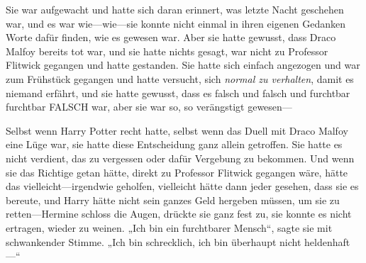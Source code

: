 Sie war aufgewacht und hatte sich daran erinnert, was letzte Nacht geschehen war, und es war wie—wie—sie konnte nicht einmal in ihren eigenen Gedanken Worte dafür finden, wie es gewesen war. Aber sie hatte gewusst, dass Draco Malfoy bereits tot war, und sie hatte nichts gesagt, war nicht zu Professor Flitwick gegangen und hatte gestanden. Sie hatte sich einfach angezogen und war zum Frühstück gegangen und hatte versucht, sich \emph{normal zu verhalten}, damit es niemand erfährt, und sie hatte gewusst, dass es falsch und falsch und furchtbar furchtbar FALSCH war, aber sie war so, so verängstigt gewesen—



Selbst wenn Harry Potter recht hatte, selbst wenn das Duell mit Draco Malfoy eine Lüge war, sie hatte diese Entscheidung ganz allein getroffen. Sie hatte es nicht verdient, das zu vergessen oder dafür Vergebung zu bekommen. Und wenn sie das Richtige getan hätte, direkt zu Professor Flitwick gegangen wäre, hätte das vielleicht—irgendwie geholfen, vielleicht hätte dann jeder gesehen, dass sie es bereute, und Harry hätte nicht sein ganzes Geld hergeben müssen, um sie zu retten—Hermine schloss die Augen, drückte sie ganz fest zu, sie konnte es nicht ertragen, wieder zu weinen.
„Ich bin ein furchtbarer Mensch“, sagte sie mit schwankender Stimme. „Ich bin schrecklich, ich bin überhaupt nicht heldenhaft—“

